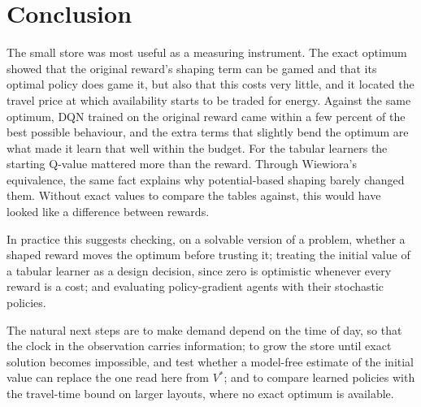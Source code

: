 \section{Conclusion}
\label{sec:conclusion}

The small store was most useful as a measuring instrument. The exact optimum showed that the original reward's shaping term can be gamed and that its optimal policy does game it, but also that this costs very little, and it located the travel price at which availability starts to be traded for energy. Against the same optimum, DQN trained on the original reward came within a few percent of the best possible behaviour, and the extra terms that slightly bend the optimum are what made it learn that well within the budget. For the tabular learners the starting Q-value mattered more than the reward. Through Wiewiora's equivalence, the same fact explains why potential-based shaping barely changed them. Without exact values to compare the tables against, this would have looked like a difference between rewards.

In practice this suggests checking, on a solvable version of a problem, whether a shaped reward moves the optimum before trusting it; treating the initial value of a tabular learner as a design decision, since zero is optimistic whenever every reward is a cost; and evaluating policy-gradient agents with their stochastic policies.

The natural next steps are to make demand depend on the time of day, so that the clock in the observation carries information; to grow the store until exact solution becomes impossible, and test whether a model-free estimate of the initial value can replace the one read here from $V^\ast$; and to compare learned policies with the travel-time bound on larger layouts, where no exact optimum is available.
